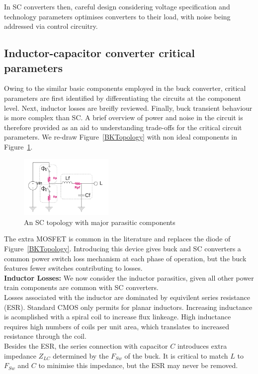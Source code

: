 \documentclass[letterpaper,twocolumn,10pt]{article}
\begin{document}
In SC converters then, careful design considering voltage specification and technology parameters optimises converters to their load, with noise being addressed via control circuitry. 

\subsection{Inductor-capacitor converter critical parameters}

Owing to the similar basic components employed in the buck converter, critical parameters are first identified by differentiating the circuits at the component level. Next, inductor losses are breifly reviewed. Finally, buck transient behaviour is more complex than SC. A brief overview of power and noise in the circuit is therefore provided as an aid to understanding trade-offs for the critical circuit parameters.
We re-draw Figure~\ref{BKTopology} with non ideal components in Figure~\ref{NonIdealBuckTopology}.\\
\begin{figure}[here]
\includegraphics[width=0.4\textwidth]{BuckTopologyParasitics}
\caption{An SC topology with major parasitic components}
\label{NonIdealBuckTopology}
\end{figure}
The extra MOSFET is common in the literature and replaces the diode of Figure~\ref{BKTopology}. Introducing this device gives buck and SC converters a common power switch loss mechanism at each phase of operation, but the buck features fewer switches contributing to losses.\\

\textbf{Inductor Losses: }We now consider the inductor parasitics, given all other power train components are common with SC converters.\\
Losses associated with the inductor are dominated by equivilent series resistance (ESR). Standard CMOS only permits for planar inductors. Increasing inductance is acomplished with a spiral coil to increase flux linkeage. High inductance requires high numbers of coils per unit area, which translates to increased resistance through the coil.\\
Besides the ESR, the series connection with capacitor $C$ introduces extra impedance $Z_{LC}$ determined by the $F_{Sw}$ of the buck. It is critical to match $L$ to $F_{Sw}$ and $C$ to minimise this impedance, but the ESR may never be removed.\\  
\end{document}
